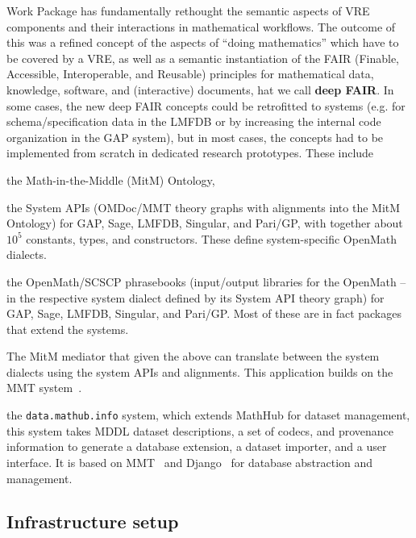 \documentclass{deliverablereport}
\def\dmh{\texttt{data.mathub.info}\xspace}
\begin{document}
\begin{newpart}
Work Package  has fundamentally rethought the semantic aspects of VRE components and their interactions in mathematical workflows.
The outcome of this was a refined concept of the aspects of ``doing mathematics'' which have to be covered by a VRE, as well as a semantic instantiation of the FAIR (Finable, Accessible, Interoperable, and Reusable) principles for mathematical data, knowledge, software, and (interactive) documents, hat we call \textbf{deep FAIR}. 
In some cases, the new deep FAIR concepts could be retrofitted to \pn systems (e.g. for schema/specification data in the LMFDB or by increasing the internal code organization in the GAP system), but in most cases, the concepts had to be implemented from scratch in dedicated research prototypes. These include
\begin{compactenum}
\item the Math-in-the-Middle (MitM) Ontology,
\item the System APIs (OMDoc/MMT theory graphs with alignments into the MitM Ontology) for GAP, Sage, LMFDB, Singular, and Pari/GP, with together about $10^5$ constants, types, and constructors. These define system-specific OpenMath dialects. 
\item the OpenMath/SCSCP phrasebooks (input/output libraries for the OpenMath -- in the respective system dialect defined by its System API theory graph) for GAP, Sage, LMFDB, Singular, and Pari/GP. Most of these are in fact packages that extend the systems.  
  \item The MitM mediator that  given the above can translate between the system dialects using the system APIs and alignments. This application builds on the MMT system~\cite{uniformal:on}. 
  \item the \dmh system, which extends MathHub for dataset management, this system takes MDDL dataset descriptions, a set of codecs, and provenance information to generate a database extension, a dataset importer, and a user interface.  It is based on MMT~\cite{uniformal:on} and Django~\cite{django:on} for database abstraction and management. 
  \end{compactenum}
\end{newpart}

\subsection{Infrastructure setup}

\end{document}
